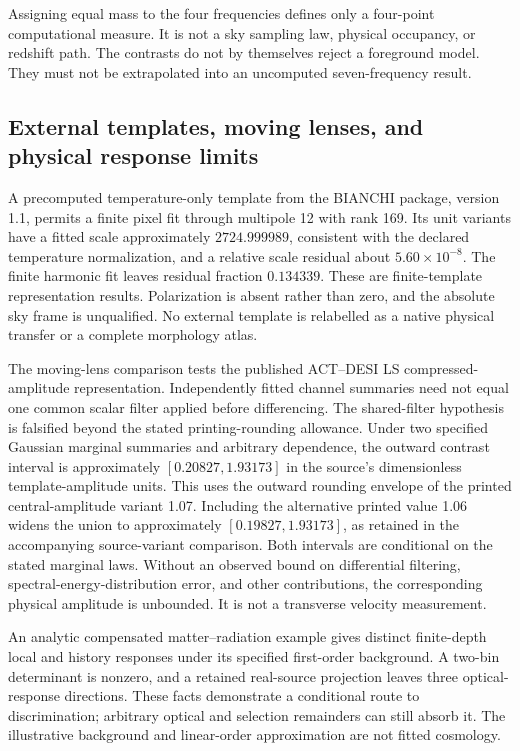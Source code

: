 Assigning equal mass to the four frequencies defines only a four-point computational measure. It is not a sky sampling law, physical occupancy, or redshift path. The contrasts do not by themselves reject a foreground model. They must not be extrapolated into an uncomputed seven-frequency result.

\subsection{External templates, moving lenses, and physical response limits}

A precomputed temperature-only template from the BIANCHI package, version 1.1,\cite{McEwenBianchi} permits a finite pixel fit through multipole 12 with rank 169. Its unit variants have a fitted scale approximately $2724.999989$, consistent with the declared temperature normalization, and a relative scale residual about $5.60\times10^{-8}$. The finite harmonic fit leaves residual fraction $0.134339$. These are finite-template representation results. Polarization is absent rather than zero, and the absolute sky frame is unqualified. No external template is relabelled as a native physical transfer or a complete morphology atlas.

The moving-lens comparison tests the published ACT--DESI LS compressed-amplitude representation.\cite{Hotinli2026} Independently fitted channel summaries need not equal one common scalar filter applied before differencing. The shared-filter hypothesis is falsified beyond the stated printing-rounding allowance. Under two specified Gaussian marginal summaries and arbitrary dependence, the outward contrast interval is approximately $[0.20827,1.93173]$ in the source's dimensionless template-amplitude units. This uses the outward rounding envelope of the printed central-amplitude variant 1.07. Including the alternative printed value 1.06 widens the union to approximately $[0.19827,1.93173]$, as retained in the accompanying source-variant comparison. Both intervals are conditional on the stated marginal laws. Without an observed bound on differential filtering, spectral-energy-distribution error, and other contributions, the corresponding physical amplitude is unbounded. It is not a transverse velocity measurement.

An analytic compensated matter--radiation example gives distinct finite-depth local and history responses under its specified first-order background. A two-bin determinant is nonzero, and a retained real-source projection leaves three optical-response directions. These facts demonstrate a conditional route to discrimination; arbitrary optical and selection remainders can still absorb it. The illustrative background and linear-order approximation are not fitted cosmology.

